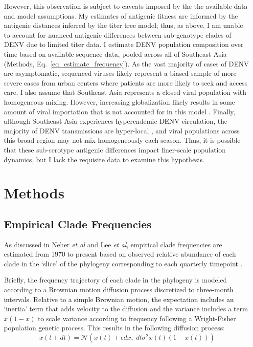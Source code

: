 However, this observation is subject to caveats imposed by the the available data and model assumptions.
My estimates of antigenic fitness are informed by the antigenic distances inferred by the titer tree model; thus, as above, I am unable to account for nuanced antigenic differences between sub-genotype clades of DENV due to limited titer data.
I estimate DENV population composition over time based on available sequence data, pooled across all of Southeast Asia (Methods, Eq.~\ref{eq_estimate_frequency}).
As the vast majority of cases of DENV are asymptomatic, sequenced viruses likely represent a biased sample of more severe cases from urban centers where patients are more likely to seek and access care.
I also assume that Southeast Asia represents a closed viral population with homogeneous mixing.
However, increasing globalization likely results in some amount of viral importation that is not accounted for in this model \citep{allicock2012phylogeography}.
Finally, although Southeast Asia experiences hyperendemic DENV circulation, the majority of DENV transmissions are hyper-local \citep{salje2017dengue}, and viral populations across this broad region may not mix homogeneously each season.
Thus, it is possible that these sub-serotype antigenic differences impact finer-scale population dynamics, but I lack the requisite data to examine this hypothesis.
\clearpage
\section{Methods}
\subsection*{Empirical Clade Frequencies}
As discussed in Neher \textit{et al} and Lee \textit{et al}, empirical clade frequencies are estimated from 1970 to present based on observed relative abundance of each clade in the `slice' of the phylogeny corresponding to each quarterly timepoint \citep{lee2018deep,neher2016prediction}.

Briefly, the frequency trajectory of each clade in the phylogeny is modeled according to a Brownian motion diffusion process discretized to three-month intervals.
Relative to a simple Brownian motion, the expectation includes an `inertia' term that adds velocity to the diffusion and the variance includes a term $x(1-x)$ to scale variance according to frequency following a Wright-Fisher population genetic process.
This results in the following diffusion process:
\begin{equation}
  \label{eq_estimate_frequency}
x(t+dt) = \mathcal{N}\left(x(t) + \epsilon dx, \; dt \sigma^2 x(t) (1-x(t))\right)
\end{equation}

